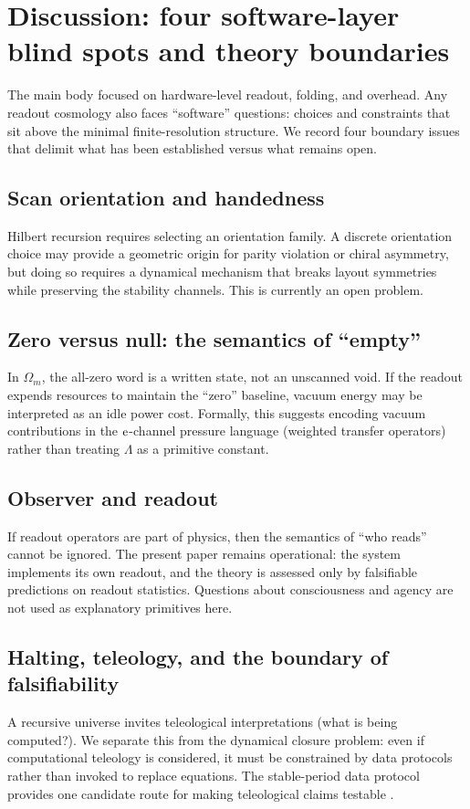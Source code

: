 
\section{Discussion: four software-layer blind spots and theory boundaries}
\label{sec:discussion}

The main body focused on hardware-level readout, folding, and overhead.
Any readout cosmology also faces ``software'' questions: choices and constraints that sit above the minimal finite-resolution structure.
We record four boundary issues that delimit what has been established versus what remains open.

\subsection{Scan orientation and handedness}
\label{subsec:handedness}

Hilbert recursion requires selecting an orientation family.
A discrete orientation choice may provide a geometric origin for parity violation or chiral asymmetry, but doing so requires a dynamical mechanism that breaks layout symmetries while preserving the stability channels.
This is currently an open problem.

\subsection{Zero versus null: the semantics of ``empty''}
\label{subsec:zero_null}

In $\Omega_m$, the all-zero word is a written state, not an unscanned void.
If the readout expends resources to maintain the ``zero'' baseline, vacuum energy may be interpreted as an idle power cost.
Formally, this suggests encoding vacuum contributions in the $\mathrm{e}$-channel pressure language (weighted transfer operators) rather than treating $\Lambda$ as a primitive constant.

\subsection{Observer and readout}
\label{subsec:observer_readout}

If readout operators are part of physics, then the semantics of ``who reads'' cannot be ignored.
The present paper remains operational: the system implements its own readout, and the theory is assessed only by falsifiable predictions on readout statistics.
Questions about consciousness and agency are not used as explanatory primitives here.

\subsection{Halting, teleology, and the boundary of falsifiability}
\label{subsec:teleology}

A recursive universe invites teleological interpretations (what is being computed?).
We separate this from the dynamical closure problem: even if computational teleology is considered, it must be constrained by data protocols rather than invoked to replace equations.
The stable-period data protocol provides one candidate route for making teleological claims testable \cite{Ma2025Tele}.




